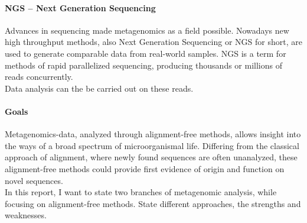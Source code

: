 \documentclass[twocolumn]{bmcart}%
\begin{document}
\paragraph*{NGS -- Next Generation Sequencing}
Advances in sequencing made metagenomics as a field possible.
Nowadays new high throughput methods, also Next Generation Sequencing or NGS for short, are used to generate comparable data from real-world samples. NGS is a term for methods of rapid parallelized sequencing, producing thousands or millions of reads concurrently.\\
 Data analysis can the be carried out on these reads.
\paragraph*{Goals}
Metagenomics-data, analyzed through align\-ment-free methods, allows insight into the ways of a broad spectrum of  microorganismal life. Differing from the classical approach of alignment, where newly found sequences are often unanalyzed, these alignment-free methods could provide first evidence of origin and function on novel sequences.\\
In this report, I want to state two branches of metagenomic analysis, while focusing on alignment-free methods. State different approaches, the strengths and weaknesses.
\end{document}
